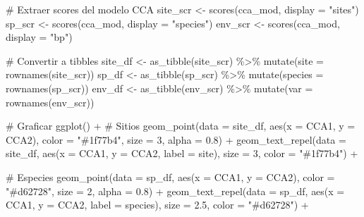 \documentclass[
  spanish,
  11pt,
  a4paper,
  DIV=11,
  numbers=noendperiod]{scrartcl}
\newenvironment{Shaded}{\begin{snugshade}}{\end{snugshade}}
\newcommand{\AttributeTok}[1]{\textcolor[rgb]{0.40,0.45,0.13}{#1}}
\newcommand{\CommentTok}[1]{\textcolor[rgb]{0.37,0.37,0.37}{#1}}
\newcommand{\DecValTok}[1]{\textcolor[rgb]{0.68,0.00,0.00}{#1}}
\newcommand{\FloatTok}[1]{\textcolor[rgb]{0.68,0.00,0.00}{#1}}
\newcommand{\FunctionTok}[1]{\textcolor[rgb]{0.28,0.35,0.67}{#1}}
\newcommand{\NormalTok}[1]{\textcolor[rgb]{0.00,0.23,0.31}{#1}}
\newcommand{\OtherTok}[1]{\textcolor[rgb]{0.00,0.23,0.31}{#1}}
\newcommand{\SpecialCharTok}[1]{\textcolor[rgb]{0.37,0.37,0.37}{#1}}
\newcommand{\StringTok}[1]{\textcolor[rgb]{0.13,0.47,0.30}{#1}}
\begin{document}
\begin{Shaded}
\begin{Highlighting}[numbers=left,,]
\CommentTok{\# Extraer scores del modelo CCA}
\NormalTok{site\_scr }\OtherTok{\textless{}{-}} \FunctionTok{scores}\NormalTok{(cca\_mod, }\AttributeTok{display =} \StringTok{"sites"}\NormalTok{)}
\NormalTok{sp\_scr   }\OtherTok{\textless{}{-}} \FunctionTok{scores}\NormalTok{(cca\_mod, }\AttributeTok{display =} \StringTok{"species"}\NormalTok{)}
\NormalTok{env\_scr  }\OtherTok{\textless{}{-}} \FunctionTok{scores}\NormalTok{(cca\_mod, }\AttributeTok{display =} \StringTok{"bp"}\NormalTok{)}

\CommentTok{\# Convertir a tibbles}
\NormalTok{site\_df }\OtherTok{\textless{}{-}} \FunctionTok{as\_tibble}\NormalTok{(site\_scr) }\SpecialCharTok{\%\textgreater{}\%} \FunctionTok{mutate}\NormalTok{(}\AttributeTok{site =} \FunctionTok{rownames}\NormalTok{(site\_scr))}
\NormalTok{sp\_df   }\OtherTok{\textless{}{-}} \FunctionTok{as\_tibble}\NormalTok{(sp\_scr) }\SpecialCharTok{\%\textgreater{}\%} \FunctionTok{mutate}\NormalTok{(}\AttributeTok{species =} \FunctionTok{rownames}\NormalTok{(sp\_scr))}
\NormalTok{env\_df  }\OtherTok{\textless{}{-}} \FunctionTok{as\_tibble}\NormalTok{(env\_scr) }\SpecialCharTok{\%\textgreater{}\%} \FunctionTok{mutate}\NormalTok{(}\AttributeTok{var =} \FunctionTok{rownames}\NormalTok{(env\_scr))}

\CommentTok{\# Graficar}
\FunctionTok{ggplot}\NormalTok{() }\SpecialCharTok{+}
  \CommentTok{\# Sitios}
  \FunctionTok{geom\_point}\NormalTok{(}\AttributeTok{data =}\NormalTok{ site\_df, }\FunctionTok{aes}\NormalTok{(}\AttributeTok{x =}\NormalTok{ CCA1, }\AttributeTok{y =}\NormalTok{ CCA2), }
             \AttributeTok{color =} \StringTok{"\#1f77b4"}\NormalTok{, }\AttributeTok{size =} \DecValTok{3}\NormalTok{, }\AttributeTok{alpha =} \FloatTok{0.8}\NormalTok{) }\SpecialCharTok{+}
  \FunctionTok{geom\_text\_repel}\NormalTok{(}\AttributeTok{data =}\NormalTok{ site\_df, }\FunctionTok{aes}\NormalTok{(}\AttributeTok{x =}\NormalTok{ CCA1, }\AttributeTok{y =}\NormalTok{ CCA2, }\AttributeTok{label =}\NormalTok{ site),}
                  \AttributeTok{size =} \DecValTok{3}\NormalTok{, }\AttributeTok{color =} \StringTok{"\#1f77b4"}\NormalTok{) }\SpecialCharTok{+}
  
  \CommentTok{\# Especies}
  \FunctionTok{geom\_point}\NormalTok{(}\AttributeTok{data =}\NormalTok{ sp\_df, }\FunctionTok{aes}\NormalTok{(}\AttributeTok{x =}\NormalTok{ CCA1, }\AttributeTok{y =}\NormalTok{ CCA2), }
             \AttributeTok{color =} \StringTok{"\#d62728"}\NormalTok{, }\AttributeTok{size =} \DecValTok{2}\NormalTok{, }\AttributeTok{alpha =} \FloatTok{0.8}\NormalTok{) }\SpecialCharTok{+}
  \FunctionTok{geom\_text\_repel}\NormalTok{(}\AttributeTok{data =}\NormalTok{ sp\_df, }\FunctionTok{aes}\NormalTok{(}\AttributeTok{x =}\NormalTok{ CCA1, }\AttributeTok{y =}\NormalTok{ CCA2, }\AttributeTok{label =}\NormalTok{ species),}
                  \AttributeTok{size =} \FloatTok{2.5}\NormalTok{, }\AttributeTok{color =} \StringTok{"\#d62728"}\NormalTok{) }\SpecialCharTok{+}
  

\end{Highlighting}
\end{Shaded}
\end{document}
